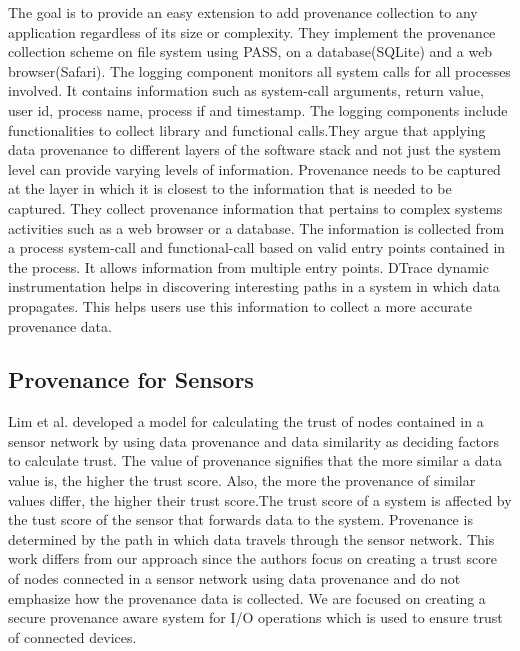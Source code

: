 The goal is to provide an easy extension to add provenance collection to any application regardless of its size or complexity. They implement the provenance collection scheme on file system using PASS, on a database(SQLite) and a web browser(Safari). 
The logging component monitors all system calls for all processes involved. It contains information such as system-call arguments, return value, user id, process name, process if and timestamp. The logging components include functionalities to collect library and functional calls.They argue that applying data provenance to different layers of the software stack and not just the system level can provide varying levels of information.  Provenance needs to be captured at the layer in which it is closest to the information that is needed to be captured. They collect provenance information that pertains to complex systems activities such as a web browser or a database. The information is collected from a process system-call and functional-call based on valid entry points contained in the process. It allows information from multiple entry points. DTrace dynamic instrumentation helps in discovering interesting paths in a system in which data propagates. This helps users use this information to collect a more accurate provenance data.


\subsection{Provenance for Sensors}
Lim et al. developed a
model for calculating the trust of nodes contained in a sensor network by using data
provenance and data similarity as deciding factors to calculate trust. The value of
provenance signifies that the more similar a data value is, the higher the trust score.
Also, the more the provenance of similar values differ, the higher their trust score.The trust score of a system is affected by the tust score of the sensor that forwards data to the system. Provenance is determined by the path in which data travels through the sensor network. This work differs from our approach since the authors focus on creating a trust score
of nodes connected in a sensor network using data provenance and do not emphasize
how the provenance data is collected. We are focused on creating a secure
provenance aware system for I/O operations which is used to ensure trust of
connected devices. 


